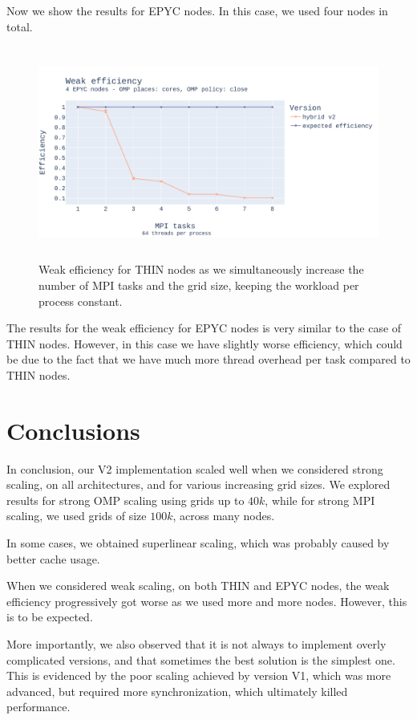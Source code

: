 \documentclass{report}
\begin{document}
Now we show the results for EPYC nodes. In this case, we used four nodes in total.

\begin{figure}[H]
\centering
\includegraphics[width=14cm, height=7cm]{./images/weak_MPI_epyc_hybrid.pdf}
\caption{\label{fig:weakmpiepychybrid} Weak efficiency for THIN nodes as 
we simultaneously increase the number of MPI tasks and the grid size, keeping the 
workload per process constant.}
\end{figure}

The results for the weak efficiency for EPYC nodes is very similar to the case 
of THIN nodes. However, in this case we have slightly worse efficiency, which 
could be due to the fact that we have much more thread overhead per task compared 
to THIN nodes.

\section{Conclusions}

In conclusion, our V2 implementation scaled well when we considered strong scaling, 
on all architectures, and for various increasing grid sizes. We explored results for 
strong OMP scaling using grids up to $40k$, while for strong MPI scaling, we used 
grids of size $100k$, across many nodes.  

In some cases, we obtained superlinear scaling, which was probably caused by better 
cache usage. 

When we considered weak scaling, on both THIN and EPYC nodes, the weak 
efficiency progressively got worse as we used more and more nodes. However, 
this is to be expected.

More importantly, we also observed that it is not always to implement overly 
complicated versions, and that sometimes the best solution is the simplest one. 
This is evidenced by the poor scaling achieved by version V1, which was more 
advanced, but required more synchronization, which ultimately killed performance.
\end{document}
